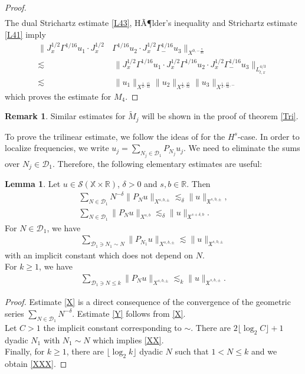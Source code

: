 \documentclass[reqno]{amsart}
\theoremstyle{Definitionl}
\theoremstyle{Definitionk}
\theoremstyle{definition}
\theoremstyle{Satzk}
\newtheorem{lemmak}[defi]{Lemma}
\theoremstyle{Satzl}
\theoremstyle{Bemerkung}
\newtheorem{bemk}[defi]{Remark}
\begin{document}
\begin{proof}
\begin{align*}
\end{align*}
The dual Strichartz estimate \eqref{L43}, HÃ¶lder's inequality and Strichartz estimate \eqref{L41} imply
\begin{align}
\big\|J_x^{1/2}\Gamma^{1/16}u_1\cdot J_x^{1/2}\,&\Gamma^{1/16}u_2\cdot J_x^{1/2}\Gamma_-^{1/16}u_3\big\|_{X^{0,-\frac{7}{16}}}\nonumber\\
\lesssim&\, \big\|J_x^{1/2}\Gamma^{1/16}u_1\cdot J_x^{1/2}\Gamma^{1/16}u_2\cdot J_x^{1/2}\Gamma_-^{1/16}u_3\big\|_{L^{4/3}_{t,x}}\nonumber\\
\lesssim&\,\|u_1\|_{X^{\frac12,\frac{15}{32}}}\|u_2\|_{X^{\frac12,\frac{15}{32}}}\|u_3\|_{X^{\frac12,\frac{15}{32},-}}\label{m44}
\end{align}
which proves the estimate for $M_4$.
\end{proof}
\begin{bemk}Similar estimates for $\tilde M_j$ will be shown in the proof of theorem \ref{Tri}.\end{bemk}
To prove the trilinear estimate, we follow the ideas of \cite[Thm. 4.1 and Thm. 4.2]{Herr} for the $H^s$-case. In order to localize frequencies, we write $u_j=\sum_{N_j\in\mathcal D_1}P_{N_j}u_j$. We need to eliminate the sums over $N_j\in\mathcal D_1$. Therefore, the following elementary estimates are useful:
\begin{lemmak}
Let $u\in\mathcal S(\mathbb X\times\mathbb R)$, $\delta>0$ and $s,b\in\mathbb R$. Then
\begin{align}
\sum_{N\in\mathcal D_1}N^{-\delta}\|P_Nu\|_{X^{s,b,\pm}}\lesssim_\delta \|u\|_{\mathfrak X^{s,b,\pm}},\label{X}\\
\sum_{N\in\mathcal D_1}\|P_Nu\|_{X^{s,b}}\lesssim_{\delta} \|u\|_{\mathfrak X^{s+\delta,b}}.\label{Y}
\end{align}
For $N\in\mathcal D_1$, we have
\begin{align}
\sum_{\mathcal D_1\ni N_1\sim N}\|P_{N_1}u\|_{X^{s,b,\pm}}\lesssim \|u\|_{\mathfrak X^{s,b,\pm}}\label{XX}
\end{align}
with an implicit constant which does not depend on $N$.\\[10pt]
For $k\ge1$, we have
\begin{align}
\sum_{\mathcal D_1\ni N\le k}\|P_Nu\|_{X^{s,b,\pm}}\lesssim_k\|u\|_{\mathfrak X^{s,b,\pm}}\label{XXX}.
\end{align}
\end{lemmak}
\begin{proof}
Estimate \eqref{X} is a direct consequence of the convergence of the geometric series $\sum_{N\in\mathcal D_1}N^{-\delta}$. Estimate \eqref{Y} follows from \eqref{X}.\\[10pt]
Let $C>1$ the implicit constant corresponding to $\sim$. There are $2\lfloor \log_2C\rfloor+1$ dyadic $N_1$ with $N_1\sim N$ which implies \eqref{XX}.\\[10pt]
Finally, for $k\ge1$, there are $\lfloor\log_2k\rfloor$ dyadic $N$ such that $1<N\le k$ and we obtain \eqref{XXX}.
\end{proof}
\end{document}
